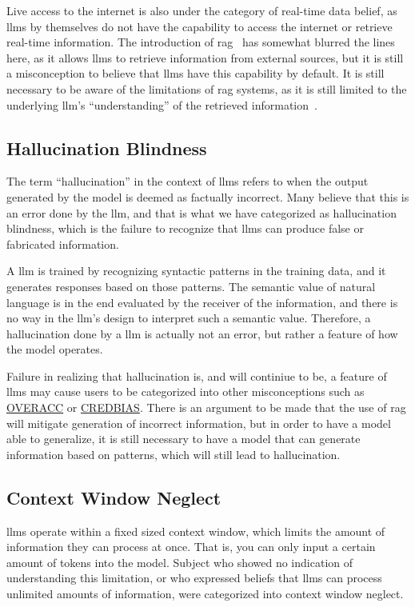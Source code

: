 Live access to the internet is also under the category of real-time data belief, as \gls{llms} by themselves do not have the capability to access the internet or retrieve real-time information. The introduction of \gls{rag}\ \cite{lewis_retrieval-augmented_2020} has somewhat blurred the lines here, as it allows \gls{llms} to retrieve information from external sources, but it is still a misconception to believe that \gls{llms} have this capability by default. It is still necessary to be aware of the limitations of \gls{rag} systems, as it is still limited to the underlying \gls{llm}'s ``understanding'' of the retrieved information\ \cite{williams_why_2024}.

\subsection{Hallucination Blindness}\label{hallblind}
The term ``hallucination'' in the context of \gls{llms} refers to when the output generated by the model is deemed as factually incorrect. Many believe that this is an error done by the \gls{llm}, and that is what we have categorized as hallucination blindness, which is the failure to recognize that \gls{llms} can produce false or fabricated information.

A \gls{llm} is trained by recognizing syntactic patterns in the training data, and it generates responses based on those patterns. The semantic value of natural language is in the end evaluated by the receiver of the information, and there is no way in the \gls{llm}'s design to interpret such a semantic value. Therefore, a hallucination done by a \gls{llm} is actually not an error, but rather a feature of how the model operates.

Failure in realizing that hallucination is, and will continiue to be, a feature of \gls{llms} may cause users to be categorized into other misconceptions such as \hyperref[overacc]{OVERACC} or \hyperref[credbias]{CREDBIAS}. There is an argument to be made that the use of \gls{rag} will mitigate generation of incorrect information, but in order to have a model able to generalize, it is still necessary to have a model that can generate information based on patterns, which will still lead to hallucination.

\subsection{Context Window Neglect}\label{contexneg}
\gls{llms} operate within a fixed sized context window, which limits the amount of information they can process at once. That is, you can only input a certain amount of tokens into the model. Subject who showed no indication of understanding this limitation, or who expressed beliefs that \gls{llms} can process unlimited amounts of information, were categorized into context window neglect.

